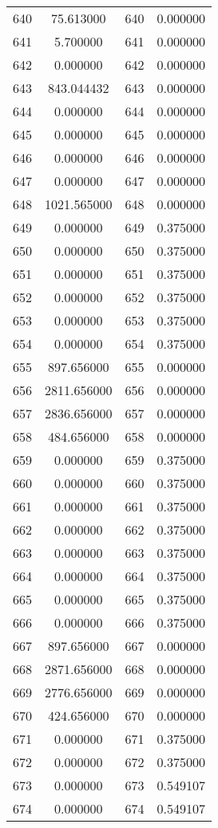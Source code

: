 \documentclass[12pt]{article}
\begin{document}
\begin{longtable}{@{}cccc@{}}
640 & 75.613000 & 640 & 0.000000 \\
641 & 5.700000 & 641 & 0.000000 \\
642 & 0.000000 & 642 & 0.000000 \\
643 & 843.044432 & 643 & 0.000000 \\
644 & 0.000000 & 644 & 0.000000 \\
645 & 0.000000 & 645 & 0.000000 \\
646 & 0.000000 & 646 & 0.000000 \\
647 & 0.000000 & 647 & 0.000000 \\
648 & 1021.565000 & 648 & 0.000000 \\
649 & 0.000000 & 649 & 0.375000 \\
650 & 0.000000 & 650 & 0.375000 \\
651 & 0.000000 & 651 & 0.375000 \\
652 & 0.000000 & 652 & 0.375000 \\
653 & 0.000000 & 653 & 0.375000 \\
654 & 0.000000 & 654 & 0.375000 \\
655 & 897.656000 & 655 & 0.000000 \\
656 & 2811.656000 & 656 & 0.000000 \\
657 & 2836.656000 & 657 & 0.000000 \\
658 & 484.656000 & 658 & 0.000000 \\
659 & 0.000000 & 659 & 0.375000 \\
660 & 0.000000 & 660 & 0.375000 \\
661 & 0.000000 & 661 & 0.375000 \\
662 & 0.000000 & 662 & 0.375000 \\
663 & 0.000000 & 663 & 0.375000 \\
664 & 0.000000 & 664 & 0.375000 \\
665 & 0.000000 & 665 & 0.375000 \\
666 & 0.000000 & 666 & 0.375000 \\
667 & 897.656000 & 667 & 0.000000 \\
668 & 2871.656000 & 668 & 0.000000 \\
669 & 2776.656000 & 669 & 0.000000 \\
670 & 424.656000 & 670 & 0.000000 \\
671 & 0.000000 & 671 & 0.375000 \\
672 & 0.000000 & 672 & 0.375000 \\
673 & 0.000000 & 673 & 0.549107 \\
674 & 0.000000 & 674 & 0.549107 \\

\end{longtable}
\end{document}
